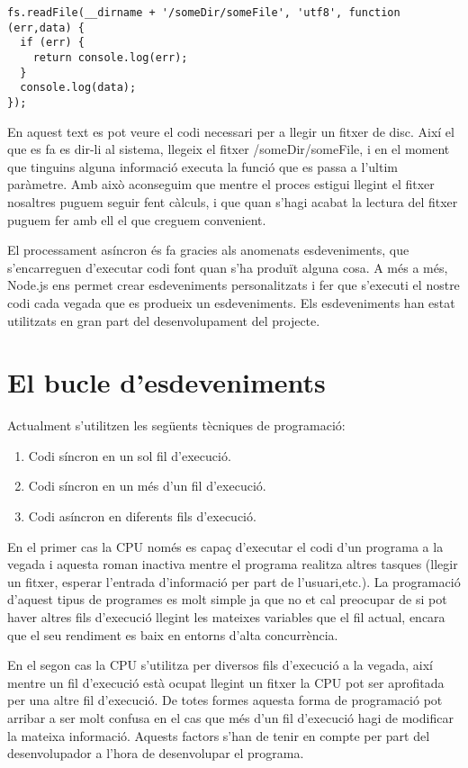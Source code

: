 \begin{lstlisting}
fs.readFile(__dirname + '/someDir/someFile', 'utf8', function (err,data) {
  if (err) {
    return console.log(err);
  }
  console.log(data);
});
\end{lstlisting}

En aquest text es pot veure el codi necessari per a llegir un fitxer de disc. Així el que es fa es dir-li al sistema, llegeix el fitxer /someDir/someFile, i en el moment que tinguins alguna informació executa la funció que es passa a l'ultim paràmetre. Amb això aconseguim que mentre el proces estigui llegint el fitxer nosaltres puguem seguir fent càlculs, i que quan s'hagi acabat la lectura del fitxer puguem fer amb ell el que creguem convenient. 

El processament asíncron és fa gracies als anomenats esdeveniments, que s'encarreguen d'executar codi font quan s'ha produït alguna cosa. A més a més, Node.js ens permet crear esdeveniments personalitzats i fer que s'executi el nostre codi cada vegada que es produeix un esdeveniments. Els esdeveniments han estat utilitzats en gran part del desenvolupament del projecte. 

\section{El bucle d'esdeveniments}

Actualment s'utilitzen les següents tècniques de programació: 

\begin{enumerate}
    \item{Codi síncron en un sol fil d'execució.}
    \item{Codi síncron en un més d'un fil d'execució.}
    \item{Codi asíncron en diferents fils d'execució.}
\end{enumerate}

En el primer cas la CPU només es capaç d'executar el codi d'un programa a la vegada i aquesta roman inactiva mentre el programa realitza altres tasques (llegir un fitxer, esperar l'entrada d'informació per part de l'usuari,etc.). La programació d'aquest tipus de programes es molt simple ja que no et cal preocupar de si pot haver altres fils d'execució llegint les mateixes variables que el fil actual, encara que el seu rendiment es baix en entorns d'alta concurrència. 

En el segon cas la CPU s'utilitza per diversos fils d'execució a la vegada, així mentre un fil d'execució està ocupat llegint un fitxer la CPU pot ser aprofitada per una altre fil d'execució. De totes formes aquesta forma de programació pot arribar a ser molt confusa en el cas que més d'un fil d'execució hagi de modificar la mateixa informació. Aquests factors s'han de tenir en compte per part del desenvolupador a l'hora de desenvolupar el programa. 

